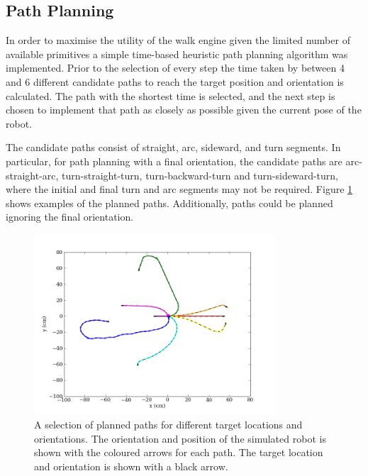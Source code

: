 \subsection{Path Planning}

In order to maximise the utility of the walk engine given the limited number of available primitives a simple time-based heuristic path planning algorithm was implemented. Prior to the selection of every step the time taken by between 4 and 6 different candidate paths to reach the target position and orientation is calculated. The path with the shortest time is selected, and the next step is chosen to implement that path as closely as possible given the current pose of the robot.

The candidate paths consist of straight, arc, sideward, and turn segments.  In particular, for path planning with a final orientation, the candidate paths are arc-straight-arc, turn-straight-turn, turn-backward-turn and turn-sideward-turn, where the initial and final turn and arc segments may not be required. Figure \ref{fig:LocomotionPathPlanning} shows examples of the planned paths. Additionally, paths could be planned ignoring the final orientation.

\begin{figure}[tbh]
	\begin{center}
		\includegraphics[width=0.8\textwidth]{locomotionfigs/pathplanning.png}
		\caption{A selection of planned paths for different target locations and orientations. The orientation and position of the simulated robot is shown with the coloured arrows for each path. The target location and orientation is shown with a black arrow.}
		\label{fig:LocomotionPathPlanning}
	\end{center}
\end{figure}

